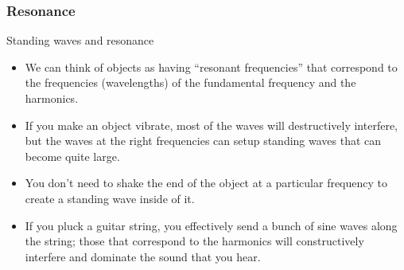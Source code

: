 \documentclass[aspectratio=169,
hyperref={colorlinks,urlcolor=blue}
]{beamer}
\begin{document}
\subsubsection{Resonance}
\label{subsubsec:resonance}
\begin{frame}{Standing waves and resonance}
\begin{itemize}
\item We can think of objects as having ``resonant frequencies'' that correspond to the frequencies (wavelengths) of the fundamental frequency and the harmonics.
\item If you make an object vibrate, most of the waves will destructively interfere, but the waves at the right frequencies can setup standing waves that can become quite large. 
\item You don't need to shake the end of the object at a particular frequency to create a standing wave inside of it. 
\item If you pluck a guitar string, you effectively send a bunch of sine waves along the string; those that correspond to the harmonics will constructively interfere and dominate the sound that you hear.
\end{itemize}
\end{frame}







\end{document}
